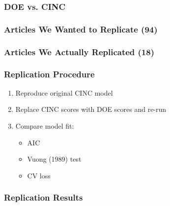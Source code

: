 \documentclass[10pt]{beamer}
\begin{document}
\begin{frame}
  \frametitle{DOE vs. CINC}

  \centering
  
\end{frame}


\begin{frame}
  \frametitle{Articles We Wanted to Replicate (94)}

  \scriptsize
  
\end{frame}

\begin{frame}
  \frametitle{Articles We Actually Replicated (18)}

  \scriptsize
  
\end{frame}

\begin{frame}
  \frametitle{Replication Procedure}

  \begin{enumerate}
    \item Reproduce original CINC model
    \item Replace CINC scores with DOE scores and re-run
    \item Compare model fit:
    \begin{itemize}
      \item AIC
      \item Vuong (1989) test
      \item CV loss
    \end{itemize}
  \end{enumerate}
\end{frame}

\begin{frame}
  \frametitle{Replication Results}

  \centering
  \only<2>{}%
\end{frame}

\end{document}
